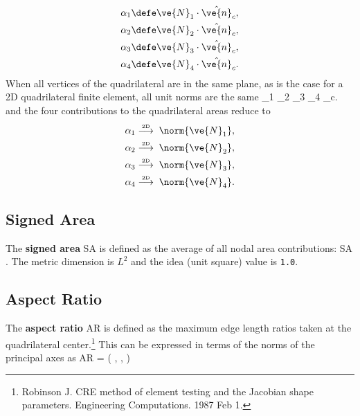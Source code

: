 \documentclass[14pt,letterpaper,fleqn]{extreport}
\begin{document}
\begin{align}
 \alpha_1 & \defe \ve{N}_1 \cdot \hat{\ve{n}}_c, \\
 \alpha_2 & \defe \ve{N}_2 \cdot \hat{\ve{n}}_c, \\
 \alpha_3 & \defe \ve{N}_3 \cdot \hat{\ve{n}}_c, \\
 \alpha_4 & \defe \ve{N}_4 \cdot \hat{\ve{n}}_c.
\end{align}
%
When all vertices of the quadrilateral are in the same plane, as is the case for a 2D
quadrilateral finite element, all unit norms are the same
\be 
 _1 
 _2 
 _3 
 _4
 _c.
\ee
and the four contributions to the quadrilateral areas reduce to
\begin{align}
 \alpha_1 & \overset{\tiny \mbox{2D}}{\longrightarrow} \; \norm{\ve{N}_1}, \\
 \alpha_2 & \overset{\tiny \mbox{2D}}{\longrightarrow} \; \norm{\ve{N}_2}, \\
 \alpha_3 & \overset{\tiny \mbox{2D}}{\longrightarrow} \; \norm{\ve{N}_3}, \\
 \alpha_4 & \overset{\tiny \mbox{2D}}{\longrightarrow} \; \norm{\ve{N}_4}.
\end{align}

\subsection{Signed Area}
The {\bf signed area} SA is defined as the average of all nodal area contributions:
\be 
\mbox{SA}  \; .
\ee
The metric dimension is $L^2$ and the idea (unit square) value is {\tt 1.0}.

\subsection{Aspect Ratio}

The {\bf aspect ratio} AR is defined as the maximum edge length ratios taken at the 
quadrilateral center.\footnote{Robinson J. CRE method 
of element testing and the Jacobian shape parameters. Engineering Computations. 
1987 Feb 1.}  
This can be expressed in terms of the norms of the principal axes as
\be 
\mbox{AR} = \max\left(
  \frac{\norm{\vX}}{\norm{\vY}}, 
  \frac{\norm{\vY}}{\norm{\vX}}, 
 \right)
\ee
\end{document}
